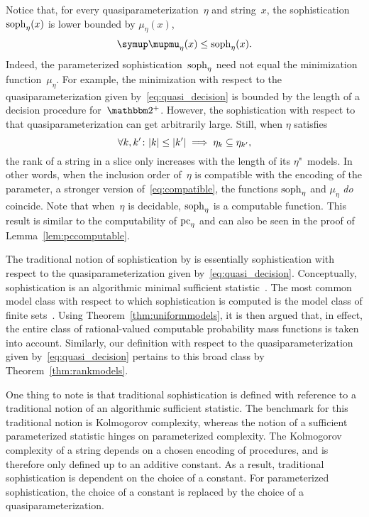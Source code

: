 Notice that, for every quasiparameterization~$\eta$ and string~$x$, the sophistication $\operatorname{soph}_\eta(x)$ is lower bounded by $\mu_\eta(x)$,
\begin{equation*}
  \mu_\eta(x) \le \soph_\eta(x).
\end{equation*}
Indeed, the parameterized sophistication~$\operatorname{soph}_\eta$ need not equal the minimization function~$\mu_\eta$.
For example, the minimization with respect to the quasiparameterization given by~\eqref{eq:quasi_decision} is bounded by the length of a decision procedure for~$\binary^+$.
However, the sophistication with respect to that quasiparameterization can get arbitrarily large.
Still, when $\eta$ satisfies
\begin{equation}
\label{eq:compatible_strong}
  \forall k, k'\colon {\lvert k\rvert} \le {\lvert k'\rvert} \implies \eta_k \subseteq \eta_{k'},
\end{equation}
the rank of a string in a slice only increases with the length of its $\eta$"~models.
In other words, when the inclusion order of~$\eta$ is compatible with the encoding of the parameter, a stronger version of~\eqref{eq:compatible}, the functions $\operatorname{soph}_\eta$ and $\mu_\eta$ \emph{do} coincide.
Note that when~$\eta$ is decidable, $\operatorname{soph}_\eta$ is a computable function.
This result is similar to the computability of $\operatorname{pc}_\eta$ and can also be seen in the proof of Lemma~\ref{lem:pccomputable}.

\begin{example}
  The traditional notion of sophistication by \textcite{koppel1988structure} is essentially sophistication with respect to the quasiparameterization given by~\eqref{eq:quasi_decision}.
  Conceptually, sophistication is an algorithmic minimal sufficient statistic~\parencite{gacs2001algorithmic,vereshchagin2004kolmogorov}.
  The most common model class with respect to which sophistication is computed is the model class of finite sets~\parencite{bloem2015two}.
  Using Theorem~\ref{thm:uniformmodels}, it is then argued that, in effect, the entire class of rational-valued computable probability mass functions is taken into account.
  Similarly, our definition with respect to the quasiparameterization given by~\eqref{eq:quasi_decision} pertains to this broad class by Theorem~\ref{thm:rankmodels}.

  One thing to note is that traditional sophistication is defined with reference to a traditional notion of an algorithmic sufficient statistic.
  The benchmark for this traditional notion is Kolmogorov complexity, whereas the notion of a sufficient parameterized statistic hinges on parameterized complexity.
  The Kolmogorov complexity of a string depends on a chosen encoding of procedures, and is therefore only defined up to an additive constant.
  As a result, traditional sophistication is dependent on the choice of a constant.
  For parameterized sophistication, the choice of a constant is replaced by the choice of a quasiparameterization.
\end{example}

